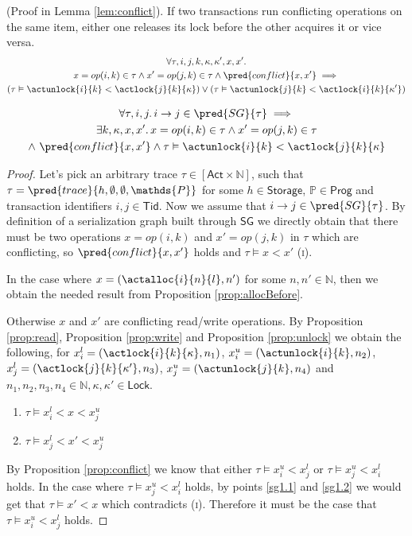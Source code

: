 \begin{prop}
	\label{prop:conflict}
	(Proof in Lemma \ref{lem:conflict}).
	If two transactions run conflicting operations on the same item, either one releases its lock before the other acquires it or vice versa.
	\begin{gather*}
		\forall \tau, i, j, k, \kappa, \kappa', x, x' \ldotp \\
		x = op(i, k) \in \tau \land x' = op(j, k) \in \tau \land \pred{conflict}{x, x'} \implies \\
		\left( \tau \vDash \actunlock{i}{k} < \actlock{j}{k}{\kappa} \right) \lor \left( \tau \vDash \actunlock{j}{k} < \actlock{i}{k}{\kappa'} \right)
	\end{gather*}
\end{prop}

\lem \label{lem:sg1}
\begin{gather*}
\forall \tau, i, j \ldotp i \rightarrow j \in \pred{SG}{\tau} \implies \\
\exists k, \kappa, x, x' \ldotp x = op(i, k) \in \tau \land x' = op(j, k) \in \tau \\
\land\ \pred{conflict}{x, x'} \land \tau \vDash \actunlock{i}{k} < \actlock{j}{k}{\kappa}
\end{gather*}
\begin{proof}
Let's pick an arbitrary trace $\tau \in [\mathsf{Act} \times \mathds{N}]$, such that $\tau = \pred{trace}{h, \emptyset, \emptyset, \mathds{P}}$ for some $h \in \mathsf{Storage}$, $\mathds{P} \in \mathsf{Prog}$ and transaction identifiers $i, j \in \mathsf{Tid}$. Now we assume that $i \rightarrow j \in \pred{SG}{\tau}$. By definition of a serialization graph built through $\mathsf{SG}$ we directly obtain that there must be two operations $x = op(i, k)$ and $x' = op(j, k)$ in $\tau$ which are conflicting, so $\pred{conflict}{x, x'}$ holds and $\tau \vDash x < x'$ (\textsc{i}).

In the case where $x = (\actalloc{i}{n}{l}, n')$ for some $n, n' \in \mathds{N}$, then we obtain the needed result from Proposition \ref{prop:allocBefore}.

Otherwise $x$ and $x'$ are conflicting read/write operations. By Proposition \ref{prop:read}, Proposition \ref{prop:write} and Proposition \ref{prop:unlock} we obtain the following, for $x_i^l = (\actlock{i}{k}{\kappa}, n_1)$, $x_i^u = (\actunlock{i}{k}, n_2)$, $x_j^l = (\actlock{j}{k}{\kappa'}, n_3)$, $x_j^u = (\actunlock{j}{k}, n_4)$ and $n_1, n_2, n_3, n_4 \in \mathds{N}, \kappa, \kappa' \in \mathsf{Lock}$.
\begin{enumerate}
	\item \label{sg1.1} $\tau \vDash x_i^l < x < x_j^u$
	\item \label{sg1.2} $\tau \vDash x_j^l < x' < x_j^u$
\end{enumerate}
By Proposition \ref{prop:conflict} we know that either $\tau \vDash x_i^u < x_j^l$ or $\tau \vDash x_j^u < x_i^l$ holds. In the case where $\tau \vDash x_j^u < x_i^l$ holds, by points \ref{sg1.1} and \ref{sg1.2} we would get that $\tau \vDash x' < x$ which contradicts (\textsc{i}). Therefore it must be the case that $\tau \vDash x_i^u < x_j^l$ holds.
\end{proof}

